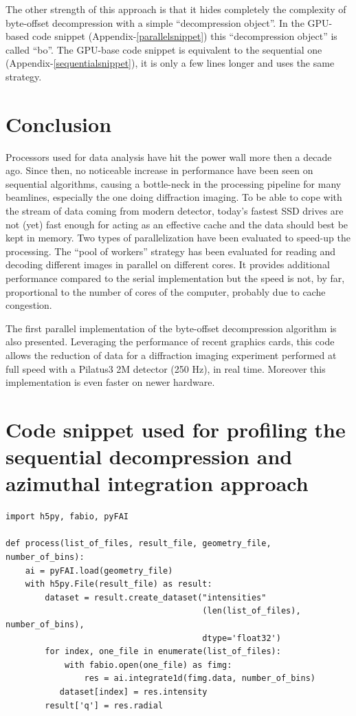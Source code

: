 \documentclass[preprint]{iucr}              %
\begin{document}
The other strength of this approach is that it hides completely the
complexity of byte-offset decompression with a simple ``decompression object''.
In the GPU-based code snippet (Appendix-\ref{parallelsnippet}) this
``decompression object'' is called ``bo''. 
The GPU-base code snippet is equivalent to the sequential one
(Appendix-\ref{sequentialsnippet}),   it is only a few lines longer and uses the
same strategy. 

\section{Conclusion}

Processors used for data analysis have hit the power wall more then
a  decade ago.
Since then, no noticeable increase in performance have been seen on
sequential algorithms, causing a bottle-neck in the processing
pipeline for many beamlines, especially the one doing diffraction imaging.
To be able to cope with the stream of data coming from modern detector,
today's fastest SSD drives are not (yet) fast  enough for acting as an
effective cache and the data should best be kept in memory.
Two types of parallelization have been evaluated to speed-up the processing.
The ``pool of workers'' strategy has been evaluated for reading and decoding
different images  in parallel on different cores.
It provides additional performance compared to the serial implementation but
the speed is not, by far, proportional to the number of cores of the computer,
probably due to cache congestion.

The first parallel implementation of the byte-offset decompression
algorithm is also presented.
Leveraging the performance of recent graphics cards, this code allows the reduction
of data for a diffraction imaging experiment performed at full speed with
a Pilatus3 2M detector (250 Hz), in real time.
Moreover this implementation is even faster on newer hardware.

\appendix
\section{Code snippet used for profiling the sequential decompression and
azimuthal integration approach}
\begin{minipage}{\linewidth}
\label{sequentialsnippet}
\begin{verbatim}
import h5py, fabio, pyFAI

def process(list_of_files, result_file, geometry_file, number_of_bins):
    ai = pyFAI.load(geometry_file)
    with h5py.File(result_file) as result:
        dataset = result.create_dataset("intensities"
                                        (len(list_of_files), number_of_bins),
                                        dtype='float32')
        for index, one_file in enumerate(list_of_files):
            with fabio.open(one_file) as fimg:
                res = ai.integrate1d(fimg.data, number_of_bins)
           dataset[index] = res.intensity
        result['q'] = res.radial
\end{verbatim}
\end{minipage}
\end{document}
